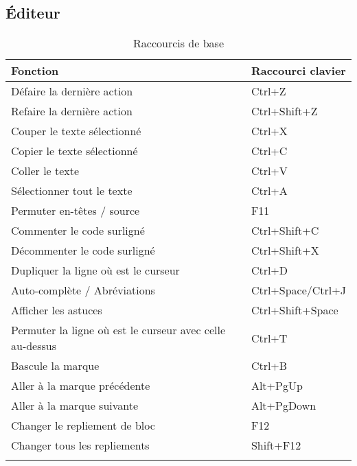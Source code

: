 \subsection{Éditeur}

{\small
\begin{longtable}{|l|l|}\hline
\textbf{Fonction}		        &	\textbf{Raccourci clavier}  \\ \hline
\endhead    %
Défaire la dernière action 	    &	Ctrl+Z                      \\ \hline
Refaire la dernière action 	    &	Ctrl+Shift+Z                \\ \hline
Couper le texte sélectionné     &   Ctrl+X                      \\ \hline
Copier le texte sélectionné     &   Ctrl+C                      \\ \hline
Coller le texte                 &   Ctrl+V                      \\ \hline
Sélectionner tout le texte      &   Ctrl+A                      \\ \hline
Permuter en-têtes / source 	    &	F11                         \\ \hline
Commenter le code surligné      &	Ctrl+Shift+C                \\ \hline
Décommenter le code surligné    & 	Ctrl+Shift+X                \\ \hline
Dupliquer la ligne où est le curseur      & 	Ctrl+D          \\ \hline
Auto-complète / Abréviations    & 	Ctrl+Space/Ctrl+J           \\ \hline
Afficher les astuces            &	Ctrl+Shift+Space            \\ \hline
Permuter la ligne où est le curseur avec celle au-dessus    &	Ctrl+T\\ \hline
Bascule la marque 	            &	Ctrl+B                      \\ \hline
Aller à la marque précédente 	&	Alt+PgUp                    \\ \hline
Aller à la marque suivante  	&	Alt+PgDown                  \\ \hline
Changer le repliement de bloc 	&	F12                         \\ \hline
Changer tous les repliements    &	Shift+F12                   \\ \hline
\caption{Raccourcis de base}
\end{longtable}
}

